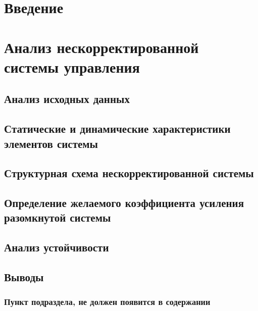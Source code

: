 \section*{Введение}
\label{sec:intro}
 \newpage

\section{Анализ нескорректированной системы управления} \newpage
\label{sec:analysys_equations}

\subsection{Анализ исходных данных} \newpage 
\label{sec:analysys_data}

\subsection{Статические и динамические характеристики элементов системы} \newpage 
\label{sec:stat_and_dyn}

\subsection{Структурная схема нескорректированной системы} \newpage 
\label{sec:str_schema}

\subsection{Определение желаемого коэффициента усиления разомкнутой системы} \newpage 
\label{sec:determ_factor}

\subsection{Анализ устойчивости} \newpage 
\label{sec:analysys_rob}

\subsection{Выводы} \newpage 
\label{sec:conclusion}

\subsubsection{Пункт подраздела, не должен появится в содержании} \newpage

